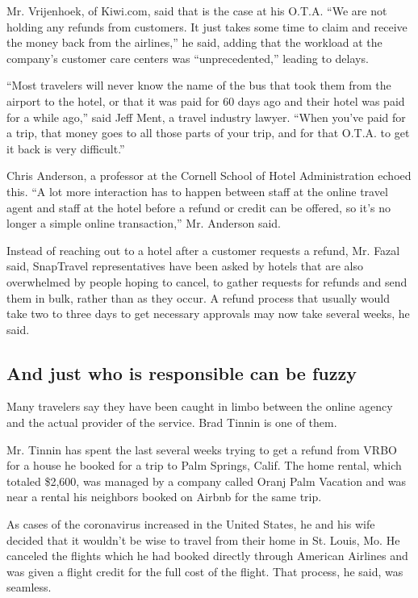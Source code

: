 Mr. Vrijenhoek, of Kiwi.com, said that is the case at his O.T.A. ``We
are not holding any refunds from customers. It just takes some time to
claim and receive the money back from the airlines,'' he said, adding
that the workload at the company's customer care centers was
``unprecedented,'' leading to delays.

``Most travelers will never know the name of the bus that took them from
the airport to the hotel, or that it was paid for 60 days ago and their
hotel was paid for a while ago,'' said Jeff Ment, a travel industry
lawyer. ``When you've paid for a trip, that money goes to all those
parts of your trip, and for that O.T.A. to get it back is very
difficult.''

Chris Anderson, a professor at the Cornell School of Hotel
Administration echoed this. ``A lot more interaction has to happen
between staff at the online travel agent and staff at the hotel before a
refund or credit can be offered, so it's no longer a simple online
transaction,'' Mr. Anderson said.

Instead of reaching out to a hotel after a customer requests a refund,
Mr. Fazal said, SnapTravel representatives have been asked by hotels
that are also overwhelmed by people hoping to cancel, to gather requests
for refunds and send them in bulk, rather than as they occur. A refund
process that usually would take two to three days to get necessary
approvals may now take several weeks, he said.

\hypertarget{and-just-who-is-responsible-can-be-fuzzy}{%
\subsection{And just who is responsible can be
fuzzy}\label{and-just-who-is-responsible-can-be-fuzzy}}

Many travelers say they have been caught in limbo between the online
agency and the actual provider of the service. Brad Tinnin is one of
them.

Mr. Tinnin has spent the last several weeks trying to get a refund from
VRBO for a house he booked for a trip to Palm Springs, Calif. The home
rental, which totaled \$2,600, was managed by a company called Oranj
Palm Vacation and was near a rental his neighbors booked on Airbnb for
the same trip.

As cases of the coronavirus increased in the United States, he and his
wife decided that it wouldn't be wise to travel from their home in St.
Louis, Mo. He canceled the flights which he had booked directly through
American Airlines and was given a flight credit for the full cost of the
flight. That process, he said, was seamless.

